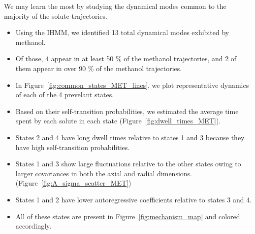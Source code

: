 \documentclass{article}
\begin{document}
  We may learn the most by studying the dynamical modes common to the majority of 
  the solute trajectories.
  \begin{itemize}
    \item Using the IHMM, we identified 13 total dynamical modes exhibited by 
    methanol. 
    \item Of those, 4 appear in at least 50 \% of the methanol trajectories, and
    2 of them appear in over 90 \% of the methanol trajectories.
    \item In Figure~\ref{fig:common_states_MET_lines}, we plot representative dynamics
    of each of the 4 prevelant states.
    \item Based on their self-transition probabilities, we estimated the average 
    time spent by each solute in each state (Figure~\ref{fig:dwell_times_MET}).
    \item States 2 and 4 have long dwell times relative to states 1 and 3 because
    they have high self-transition probabilities.
    \item States 1 and 3 show large fluctuations relative to the other states owing
    to larger covariances in both the axial and radial dimensions. (Figure~\ref{fig:A_sigma_scatter_MET})
    \item States 1 and 2 have lower autoregressive coefficients relative to states
    3 and 4.
    \item All of these states are present in Figure~\ref{fig:mechanism_map} and colored
    accordingly.
  \end{itemize} 
  
\end{document}
